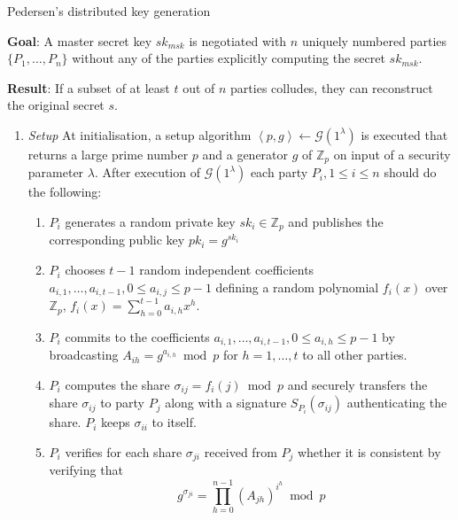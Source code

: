 \begin{algorithm}
\caption{Pedersen's distributed key generation~\cite{art:Pedersen91a}}
\label{alg:pedersen_dkg}
\begin{description}
 \item \textbf{Goal}: A master secret key $sk_{msk}$ is negotiated with $n$ uniquely numbered parties $\{ P_1, \ldots, P_n \}$ without any of the parties explicitly computing the secret $sk_{msk}$.
 
 \item \textbf{Result}: If a subset of at least $t$ out of $n$ parties colludes, they can reconstruct the original secret $s$.
\end{description}
 \begin{enumerate}
  \item \textit{Setup} At initialisation, a setup algorithm $\left< p, g \right> \leftarrow \mathcal{G} \left( 1^{\lambda} \right)$ is executed that returns a large prime number $p$ and a generator $g$ of $\mathbb{Z}_p$ on input of a security parameter $\lambda$. After execution of $\mathcal{G} \left( 1^{\lambda} \right)$ each party $P_i, 1 \leq i \leq n$ should do the following:
   \begin{enumerate}
    \item $P_i$ generates a random private key $sk_i \in \mathbb{Z}_p$ and publishes the corresponding public key $pk_i = g^{sk_i}$
    \item $P_i$ chooses $t-1$ random independent coefficients $a_{i,1}, \ldots, a_{i,t-1}, 0 \leq a_{i,j} \leq p-1$ defining a random polynomial $f_i \left( x \right)$ over $\mathbb{Z}_p$, $f_i \left( x \right) = \sum^{t-1}_{h=0} a_{i,h} x^h$.
    \item $P_i$ commits to the coefficients $a_{i,1}, \ldots, a_{i,t-1}, 0 \leq a_{i,h} \leq p-1$ by broadcasting $A_{ih} = g^{a_{i,h}} \bmod p$ for $h = 1, \ldots, t$ to all other parties.
    \item $P_i$ computes the share $\sigma_{ij} = f_i \left( j \right) \bmod p$ and securely transfers the share $\sigma_{ij}$ to party $P_j$ along with a signature $S_{P_i} \left( \sigma_{ij} \right)$ authenticating the share. $P_i$ keeps $\sigma_{ii}$ to itself.
    \item $P_i$ verifies for each share $\sigma_{ji}$ received from $P_j$ whether it is consistent by verifying that
    \begin{equation*}
     g^{\sigma_{ji}} = \prod_{h=0}^{n-1} \left( A_{jh} \right)^{i^h} \bmod p
    \end{equation*}

\end{enumerate}
\end{enumerate}
\end{algorithm}
